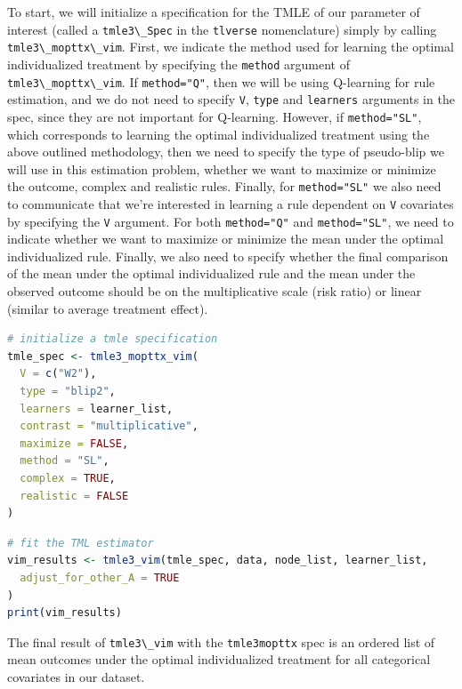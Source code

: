 \documentclass[12pt, krantz2,]{krantz}
\newcommand{\passthrough}[1]{#1}
\theoremstyle{definition}
\theoremstyle{definition}
\theoremstyle{definition}
\newcommand{\1}{\mathbbm{1}}
\begin{document}
To start, we will initialize a specification for the TMLE of our parameter of
interest (called a \passthrough{\lstinline!tmle3\_Spec!} in the \passthrough{\lstinline!tlverse!} nomenclature) simply by calling
\passthrough{\lstinline!tmle3\_mopttx\_vim!}. First, we indicate the method used for learning the optimal
individualized treatment by specifying the \passthrough{\lstinline!method!} argument of
\passthrough{\lstinline!tmle3\_mopttx\_vim!}. If \passthrough{\lstinline!method="Q"!}, then we will be using Q-learning for rule
estimation, and we do not need to specify \passthrough{\lstinline!V!}, \passthrough{\lstinline!type!} and \passthrough{\lstinline!learners!} arguments
in the spec, since they are not important for Q-learning. However, if
\passthrough{\lstinline!method="SL"!}, which corresponds to learning the optimal individualized
treatment using the above outlined methodology, then we need to specify the type
of pseudo-blip we will use in this estimation problem, whether we want to
maximize or minimize the outcome, complex and realistic rules. Finally, for
\passthrough{\lstinline!method="SL"!} we also need to communicate that we're interested in learning a
rule dependent on \passthrough{\lstinline!V!} covariates by specifying the \passthrough{\lstinline!V!} argument. For both
\passthrough{\lstinline!method="Q"!} and \passthrough{\lstinline!method="SL"!}, we need to indicate whether we want to maximize
or minimize the mean under the optimal individualized rule. Finally, we also
need to specify whether the final comparison of the mean under the optimal
individualized rule and the mean under the observed outcome should be on the
multiplicative scale (risk ratio) or linear (similar to average treatment
effect).

\begin{lstlisting}[language=R]
# initialize a tmle specification
tmle_spec <- tmle3_mopttx_vim(
  V = c("W2"),
  type = "blip2",
  learners = learner_list,
  contrast = "multiplicative",
  maximize = FALSE,
  method = "SL",
  complex = TRUE,
  realistic = FALSE
)
\end{lstlisting}

\begin{lstlisting}[language=R]
# fit the TML estimator
vim_results <- tmle3_vim(tmle_spec, data, node_list, learner_list,
  adjust_for_other_A = TRUE
)
print(vim_results)
\end{lstlisting}

The final result of \passthrough{\lstinline!tmle3\_vim!} with the \passthrough{\lstinline!tmle3mopttx!} spec is an ordered list
of mean outcomes under the optimal individualized treatment for all categorical
covariates in our dataset.
\end{document}
